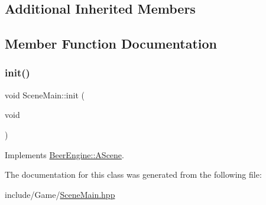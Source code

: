 \subsection*{Additional Inherited Members}


\subsection{Member Function Documentation}
\mbox{\label{class_scene_main_a4406dc5cf9807edcf360ba416de928e2}} 
\subsubsection{\texorpdfstring{init()}{init()}}
{\footnotesize\ttfamily void Scene\+Main\+::init (\begin{DoxyParamCaption}\item[{void}]{ }\end{DoxyParamCaption})\hspace{0.3cm}{\ttfamily [virtual]}}



Implements \mbox{\hyperlink{class_beer_engine_1_1_a_scene_a7a55b4e506ae618e6596ae812ad48db0}{Beer\+Engine\+::\+A\+Scene}}.



The documentation for this class was generated from the following file\+:\begin{DoxyCompactItemize}
\item 
include/\+Game/\mbox{\hyperlink{_scene_main_8hpp}{Scene\+Main.\+hpp}}\end{DoxyCompactItemize}
